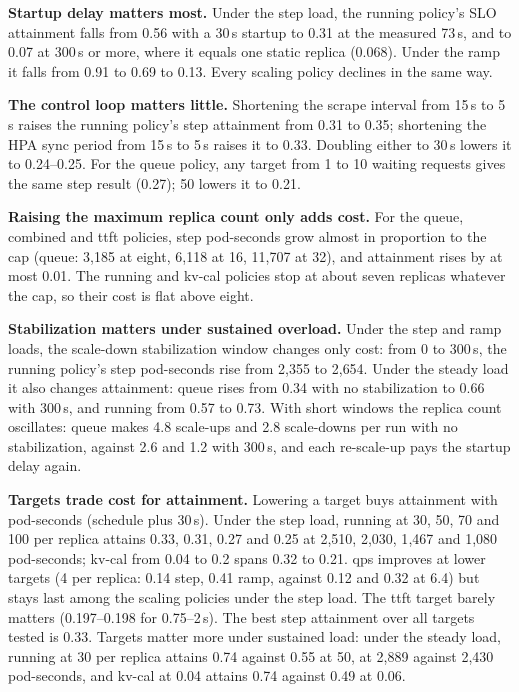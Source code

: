 \documentclass[10pt,conference]{IEEEtran}
\begin{document}
\textbf{Startup delay matters most.} Under the step load, the running policy's
SLO attainment falls from 0.56 with a 30\,s startup to 0.31 at the measured
73\,s, and to 0.07 at 300\,s or more, where it equals one static replica
(0.068). Under the ramp it falls from 0.91 to 0.69 to 0.13. Every scaling policy
declines in the same way.

\textbf{The control loop matters little.} Shortening the scrape interval from
15\,s to 5\,s raises the running policy's step attainment from 0.31 to 0.35;
shortening the HPA sync period from 15\,s to 5\,s raises it to 0.33. Doubling
either to 30\,s lowers it to 0.24--0.25. For the queue policy, any target from 1
to 10 waiting requests gives the same step result (0.27); 50 lowers it to 0.21.

\textbf{Raising the maximum replica count only adds cost.} For the queue,
combined and ttft policies, step pod-seconds grow almost in proportion to the
cap (queue: 3{,}185 at eight, 6{,}118 at 16, 11{,}707 at 32), and attainment
rises by at most 0.01. The running and kv-cal policies stop at about seven
replicas whatever the cap, so their cost is flat above eight.

\textbf{Stabilization matters under sustained overload.} Under the step and
ramp loads, the scale-down stabilization window changes only cost: from 0 to
300\,s, the running policy's step pod-seconds rise from 2{,}355 to 2{,}654.
Under the steady load it also changes attainment: queue rises from 0.34 with
no stabilization to 0.66 with 300\,s, and running from 0.57 to 0.73. With short
windows the replica count oscillates: queue makes 4.8 scale-ups and 2.8
scale-downs per run with no stabilization, against 2.6 and 1.2 with 300\,s,
and each re-scale-up pays the startup delay again.

\textbf{Targets trade cost for attainment.} Lowering a
target buys attainment with pod-seconds (schedule plus 30\,s). Under the step
load, running at 30, 50, 70 and 100 per replica attains 0.33, 0.31, 0.27 and
0.25 at 2{,}510, 2{,}030, 1{,}467 and 1{,}080 pod-seconds; kv-cal from 0.04 to
0.2 spans 0.32 to 0.21. qps improves at lower targets (4 per replica: 0.14 step,
0.41 ramp, against 0.12 and 0.32 at 6.4) but stays last among the scaling
policies under the step load. The ttft target barely matters (0.197--0.198 for
0.75--2\,s). The best step attainment over all targets tested is 0.33. Targets
matter more under sustained load: under the steady load, running at 30 per
replica attains 0.74 against 0.55 at 50, at 2{,}889 against 2{,}430
pod-seconds, and kv-cal at 0.04 attains 0.74 against 0.49 at 0.06.
\end{document}
